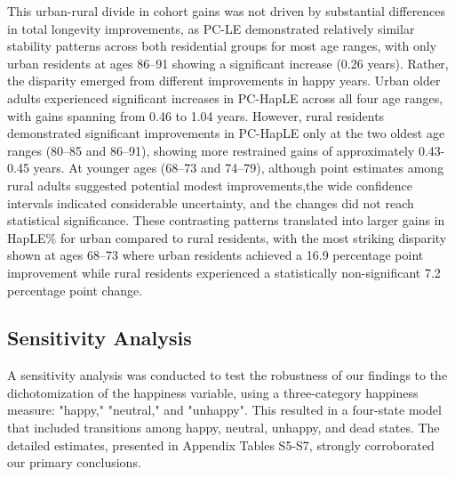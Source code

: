 \documentclass[12pt, a4paper]{article}
\begin{document}
This urban-rural divide in cohort gains was not driven by substantial differences in total longevity improvements, as PC-LE demonstrated relatively similar stability patterns across both residential groups for most age ranges, with only urban residents at ages 86–91 showing a significant increase (0.26 years). Rather, the disparity emerged from different improvements in happy years. Urban older adults experienced significant increases in PC-HapLE across all four age ranges, with gains spanning from 0.46 to 1.04 years. However, rural residents demonstrated significant improvements in PC-HapLE only at the two oldest age ranges (80–85 and 86–91), showing more restrained gains of approximately 0.43-0.45 years. At younger ages (68–73 and 74–79), although point estimates among rural adults suggested potential modest improvements,the wide confidence intervals indicated considerable uncertainty, and the changes did not reach statistical significance. These contrasting patterns translated into larger gains in HapLE\% for urban compared to rural residents, with the most striking disparity shown at ages 68–73 where urban residents achieved a 16.9 percentage point improvement while rural residents experienced a statistically non-significant 7.2 percentage point change.

\subsection{Sensitivity Analysis}

A sensitivity analysis was conducted to test the robustness of our findings to the dichotomization of the happiness variable, using a three-category happiness measure: "happy," "neutral," and "unhappy". This resulted in a four-state model that included transitions among happy, neutral, unhappy, and dead states. The detailed estimates, presented in Appendix Tables S5-S7, strongly corroborated our primary conclusions.
\end{document}
